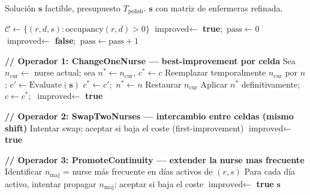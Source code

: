 \begin{algorithm}[H]
\caption{\textsc{NursePolisher} — Pulido hill-climbing dedicado a la matriz de enfermeras.}
\label{alg:nurse-polisher}
\begin{algorithmic}[1]
\Require Solución $\mathbf{s}$ factible, presupuesto $T_{\text{polish}}$.
\Ensure $\mathbf{s}$ con matriz de enfermeras refinada.

\State $\mathcal{C} \gets \{(r, d, s) : \text{occupancy}(r, d) > 0\}$
\State $\text{improved} \gets$ \textbf{true};\ $\text{pass} \gets 0$
   \State $\text{improved} \gets$ \textbf{false};\ $\text{pass} \gets \text{pass} + 1$

   \Statex \quad\textbf{// Operador 1: ChangeOneNurse — best-improvement por celda}
      \State Sea $n_{\text{cur}} \gets $ nurse actual; sea $n^{\ast} \gets n_{\text{cur}}$, $c^{\ast} \gets c$
         \State Reemplazar temporalmente $n_{\text{cur}}$ por $n$; $c' \gets \text{Evaluate}(\mathbf{s})$
          \State $c^{\ast} \gets c'$;\ $n^{\ast} \gets n$ \EndIf
         \State Restaurar $n_{\text{cur}}$
      \EndFor
         \State Aplicar $n^{\ast}$ definitivamente;\ $c \gets c^{\ast}$;\ $\text{improved} \gets$ \textbf{true}
      \EndIf
   \EndFor

   \Statex \quad\textbf{// Operador 2: SwapTwoNurses — intercambio entre celdas (mismo shift)}
      \State Intentar swap; aceptar si baja el coste (first-improvement)
   \EndFor
    \State $\text{improved} \gets$ \textbf{true} \EndIf

   \Statex \quad\textbf{// Operador 3: PromoteContinuity — extender la nurse mas frecuente}
      \State Identificar $n_{\text{maj}}$ = nurse más frecuente en días activos de $(r,s)$
      \State Para cada día activo, intentar propagar $n_{\text{maj}}$; aceptar si baja el coste
   \EndFor
    \State $\text{improved} \gets$ \textbf{true} \EndIf
\EndWhile
\State \Return $\mathbf{s}$
\end{algorithmic}
\end{algorithm}
